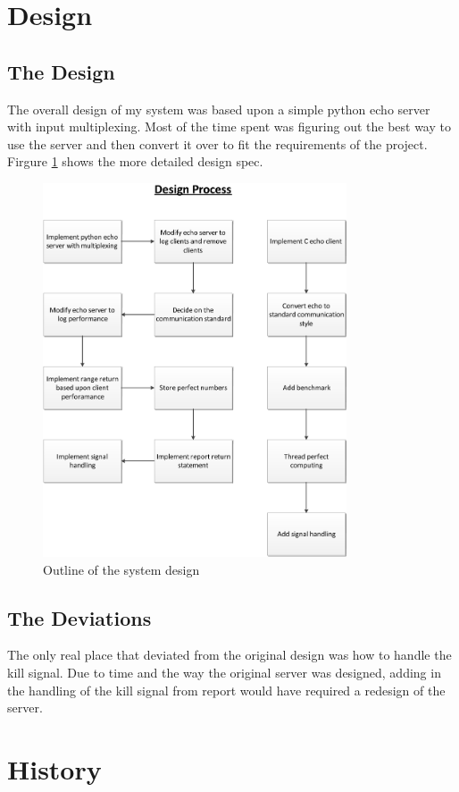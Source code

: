 \documentclass[letterpaper,10pt,titlepage]{article}
\begin{document}
\section{Design}
\label{System Design & Deviations}

\subsection{The Design}
\label{DesingProcess}
The overall design of my system was based upon a simple python echo server with input multiplexing. Most of the time spent was figuring out the best way to use the server and then convert it over to fit the requirements of the project. Firgure \ref{overflow} shows the more detailed design spec.
\begin{figure}[ht!]
\centering
\includegraphics[width=90mm]{HW5Design.eps}
\caption{Outline of the system design}
\label{overflow}
\end{figure}

\subsection{The Deviations}
\label{Deviations}
The only real place that deviated from the original design was how to handle the kill signal. Due to time and the way the original server was designed, adding in the handling of the kill signal from report would have required a redesign of the server.
\section{History}
\label{myar Revision History}
%
\end{document}
